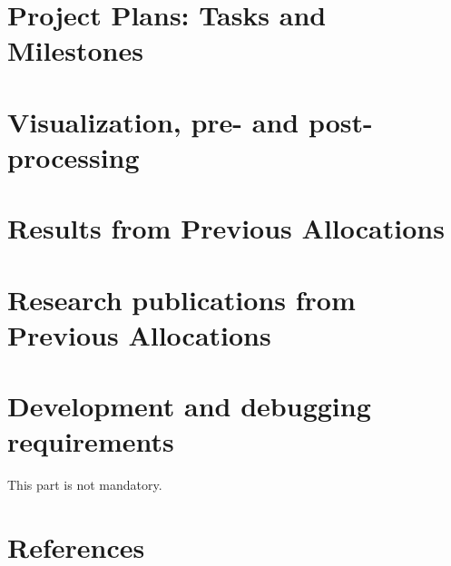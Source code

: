 \documentclass[11pt]{article}
\begin{document}
\section{Project Plans: Tasks and Milestones}

\section{Visualization, pre- and post-processing}

\section{Results from Previous Allocations}

\section{Research publications from Previous Allocations}

\section{Development and debugging requirements}
This part is not mandatory.

\section*{References}



\end{document}
